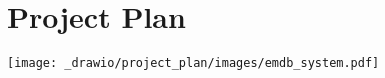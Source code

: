 \chapter{Project Plan}
\begin{center}
    \texttt{[image: \_drawio/project\_plan/images/emdb\_system.pdf]}
\end{center}
